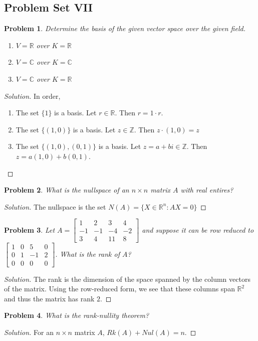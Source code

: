 \documentclass{article}
\theoremstyle{mystyle}
\newtheorem{problem}{Problem}[section]
\begin{document}
\subsection{Problem Set VII}
\begin{problem}
Determine the basis of the given vector space over the given field.
\begin{enumerate}
    \item $V=\mathbb{R}$ over $K=\mathbb{R}$
    \item $V=\mathbb{C}$ over $K=\mathbb{C}$
    \item $V=\mathbb{C}$ over $K=\mathbb{R}$
\end{enumerate}
\end{problem}
\begin{proof}[Solution]
In order,
\begin{enumerate}
    \item The set $\{1\}$ is a basis. Let $r \in \mathbb{R}$. Then $r=1\cdot r$.
    \item The set $\{(1,0)\}$ is a basis. Let $z\in \mathbb{Z}$. Then $z\cdot(1,0) = z$
    \item The set $\{(1,0),(0,1)\}$ is a basis. Let $z=a+bi\in \mathbb{Z}$. Then $z = a(1,0)+b(0,1)$.
\end{enumerate}
\end{proof}
\begin{problem}
What is the nullspace of an $n\times n$ matrix $A$ with real entires?
\end{problem}
\begin{proof}[Solution]
The nullspace is the set $N(A) = \{X\in \mathbb{R}^n: AX = 0\}$
\end{proof}
\begin{problem}
Let $A=\begin{bmatrix} 1 & 2 & 3 & 4 \\ -1 & -1 & -4 & -2 \\ 3 & 4 & 11 & 8 \end{bmatrix}$ and suppose it can be row reduced to $\begin{bmatrix} 1 & 0 & 5 & 0 \\ 0 & 1 & -1 & 2 \\ 0 & 0 & 0 & 0 \end{bmatrix}$. What is the rank of $A$?
\end{problem}
\begin{proof}[Solution]
The rank is the dimension of the space spanned by the column vectors of the matrix. Using the row-reduced form, we see that these columns span $\mathbb{R}^2$ and thus the matrix has rank $2$.
\end{proof}
\begin{problem}
What is the rank-nullity theorem?
\end{problem}
\begin{proof}[Solution]
For an $n\times n$ matrix $A$, $Rk(A)+Nul(A) = n$.
\end{proof}
\end{document}
